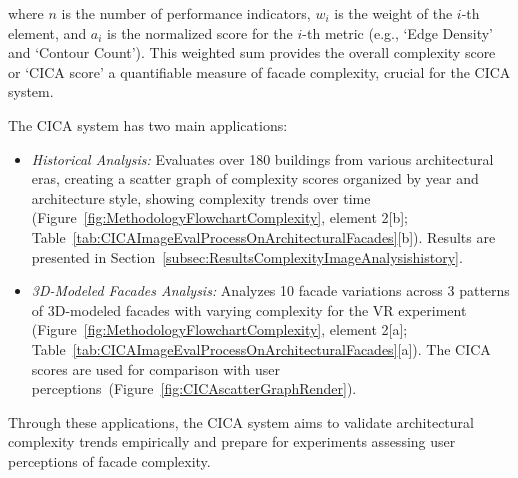 where \(n\) is the number of performance indicators, \(w_i\) is the weight of the \(i\)-th element, and \(a_i\) is the normalized score for the \(i\)-th metric (e.g., `Edge Density' and `Contour Count').
This weighted sum provides the overall complexity score or `CICA score' a quantifiable measure of facade complexity, crucial for the CICA system.

The CICA system has two main applications:
\begin{itemize}
    \item \textit{Historical Analysis:} Evaluates over 180 buildings from various architectural eras, creating a scatter graph of complexity scores organized by year and architecture style, showing complexity trends over time (Figure~\ref{fig:MethodologyFlowchartComplexity}, element 2[b]; Table~\ref{tab:CICAImageEvalProcessOnArchitecturalFacades}[b]). Results are presented in Section~\ref{subsec:ResultsComplexityImageAnalysishistory}.
    \item \textit{3D-Modeled Facades Analysis:} Analyzes 10 facade variations across 3 patterns of 3D-modeled facades with varying complexity for the VR experiment (Figure~\ref{fig:MethodologyFlowchartComplexity}, element 2[a]; Table~\ref{tab:CICAImageEvalProcessOnArchitecturalFacades}[a]). The CICA scores are used for comparison with user perceptions~(Figure~\ref{fig:CICAscatterGraphRender}).
\end{itemize}

Through these applications, the CICA system aims to validate architectural complexity trends empirically and prepare for experiments assessing user perceptions of facade complexity.
